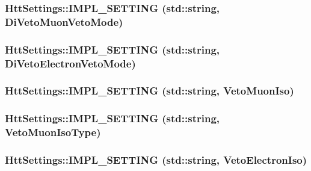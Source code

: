 \label{classHttSettings_a4b994d80181858ca1b197d37322e1126}
\hypertarget{classHttSettings_a614b9f9a6448fcd0eae1d09a75e1723c}{
\subsubsection[{IMPL\_\-SETTING}]{\setlength{\rightskip}{0pt plus 5cm}HttSettings::IMPL\_\-SETTING (std::string, \/  DiVetoMuonVetoMode)}}
\label{classHttSettings_a614b9f9a6448fcd0eae1d09a75e1723c}
\hypertarget{classHttSettings_a2ab5b01575a9c20f5b3f484a923b9175}{
\subsubsection[{IMPL\_\-SETTING}]{\setlength{\rightskip}{0pt plus 5cm}HttSettings::IMPL\_\-SETTING (std::string, \/  DiVetoElectronVetoMode)}}
\label{classHttSettings_a2ab5b01575a9c20f5b3f484a923b9175}
\hypertarget{classHttSettings_a3a13d1b4ee69f3334d779ce4b9aba0f9}{
\subsubsection[{IMPL\_\-SETTING}]{\setlength{\rightskip}{0pt plus 5cm}HttSettings::IMPL\_\-SETTING (std::string, \/  VetoMuonIso)}}
\label{classHttSettings_a3a13d1b4ee69f3334d779ce4b9aba0f9}
\hypertarget{classHttSettings_a208e159a71c3cb2ad25e71e057de2ec6}{
\subsubsection[{IMPL\_\-SETTING}]{\setlength{\rightskip}{0pt plus 5cm}HttSettings::IMPL\_\-SETTING (std::string, \/  VetoMuonIsoType)}}
\label{classHttSettings_a208e159a71c3cb2ad25e71e057de2ec6}
\hypertarget{classHttSettings_a780562e8bdad824022e61ce90585851e}{
\subsubsection[{IMPL\_\-SETTING}]{\setlength{\rightskip}{0pt plus 5cm}HttSettings::IMPL\_\-SETTING (std::string, \/  VetoElectronIso)}}
